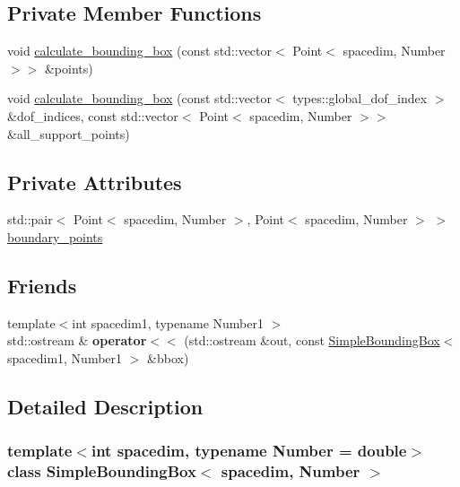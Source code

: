 \subsection*{Private Member Functions}
\begin{DoxyCompactItemize}
\item 
void \hyperlink{classSimpleBoundingBox_a140e9c7c01b868cfe6a5288f69522bf4}{calculate\+\_\+bounding\+\_\+box} (const std\+::vector$<$ Point$<$ spacedim, Number $>$$>$ \&points)
\item 
void \hyperlink{classSimpleBoundingBox_aafff59e6c56578638d58ca6095024bac}{calculate\+\_\+bounding\+\_\+box} (const std\+::vector$<$ types\+::global\+\_\+dof\+\_\+index $>$ \&dof\+\_\+indices, const std\+::vector$<$ Point$<$ spacedim, Number $>$$>$ \&all\+\_\+support\+\_\+points)
\end{DoxyCompactItemize}
\subsection*{Private Attributes}
\begin{DoxyCompactItemize}
\item 
std\+::pair$<$ Point$<$ spacedim, Number $>$, Point$<$ spacedim, Number $>$ $>$ \hyperlink{classSimpleBoundingBox_a066f18179d514c16ac68baa5ebd85ba5}{boundary\+\_\+points}
\end{DoxyCompactItemize}
\subsection*{Friends}
\begin{DoxyCompactItemize}
\item 
\mbox{\label{classSimpleBoundingBox_a68f8b2f59494f354ca2bc781aa56833e}} 
{\footnotesize template$<$int spacedim1, typename Number1 $>$ }\\std\+::ostream \& {\bfseries operator$<$$<$} (std\+::ostream \&out, const \hyperlink{classSimpleBoundingBox}{Simple\+Bounding\+Box}$<$ spacedim1, Number1 $>$ \&bbox)
\end{DoxyCompactItemize}


\subsection{Detailed Description}
\subsubsection*{template$<$int spacedim, typename Number = double$>$\newline
class Simple\+Bounding\+Box$<$ spacedim, Number $>$}

